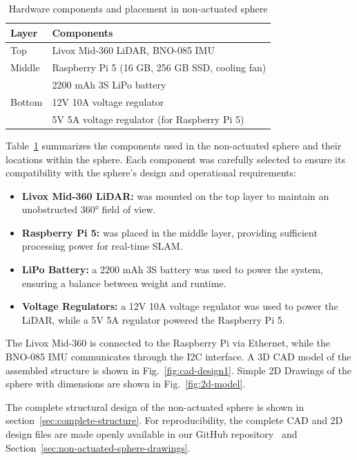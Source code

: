\documentclass[english, bachelor, utf8]{base/thesis_telematics}
\begin{document}
\begin{table}
\centering
\caption{Hardware components and placement in non-actuated sphere}
\label{tab:hardware_components_non_actuated}
\begin{tabularx}{\linewidth}{@{}l X@{}}
\toprule
\textbf{Layer} & \textbf{Components} \\
\midrule
Top    & Livox Mid-360 LiDAR, BNO-085 IMU \\
Middle & Raspberry Pi 5 (16 GB, 256 GB SSD, cooling fan) \\
       & 2200 mAh 3S LiPo battery \\
Bottom & 12V 10A voltage regulator \\
       & 5V 5A voltage regulator (for Raspberry Pi 5) \\

\bottomrule
\end{tabularx}
\vspace{-1em}
\end{table}
Table~\ref{tab:hardware_components_non_actuated} summarizes the components used in the non-actuated sphere and their locations within the sphere.
Each component was carefully selected to ensure its compatibility with the sphere's design and operational requirements:
\begin{itemize}
    \item \textbf{Livox Mid-360 LiDAR:} was mounted on the top layer to maintain an unobstructed 360° field of view.
    \item \textbf{Raspberry Pi 5:} was placed in the middle layer, providing sufficient processing power for real-time SLAM.
    \item \textbf{LiPo Battery:} a 2200 mAh 3S battery was used to power the system, ensuring a balance between weight and runtime.
    \item \textbf{Voltage Regulators:} a 12V 10A voltage regulator was used to power the LiDAR, while a 5V 5A regulator powered the Raspberry Pi 5.
\end{itemize}
The Livox Mid-360 is connected to the Raspberry Pi via Ethernet, while the BNO-085 IMU communicates through the I2C interface. 
A 3D CAD model of the assembled structure is shown in Fig.~\ref{fig:cad-design1}.
Simple 2D Drawings of the sphere with dimensions are shown in Fig.~\ref{fig:2d-model}.

The complete structural design of the non-actuated sphere is shown in section~\ref{sec:complete-structure}.
For reproducibility, the complete CAD and 2D design files are made openly available in our GitHub repository~\cite{githubsphere} and Section~\ref{sec:non-actuated-sphere-drawings}.
\clearpage
\end{document}
